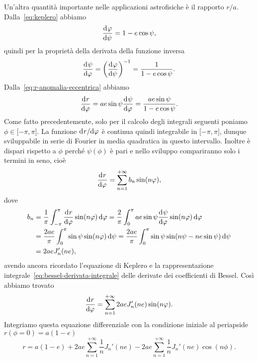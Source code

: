 Un'altra quantità importante nelle applicazioni astrofisiche è il rapporto
$r/a$. Dalla~\eqref{eq:keplero} abbiamo
\begin{equation}
  \frac{{\mathop{}\!\mathrm{d}^{}}\varphi}{\mathop{}\!\mathrm{d} {\psi}^{}} = 1 -e\cos\psi,
\end{equation}
quindi per la proprietà della derivata della funzione inversa
\begin{equation}
  \frac{{\mathop{}\!\mathrm{d}^{}}\psi}{\mathop{}\!\mathrm{d} {\varphi}^{}} =
  \left(
    \frac{{\mathop{}\!\mathrm{d}^{}}\varphi}{\mathop{}\!\mathrm{d} {\psi}^{}}
  \right)^{-1} = \frac{1}{1 - e\cos\psi}.
\end{equation}
Dalla~\eqref{eq:r-anomalia-eccentrica} abbiamo
\begin{equation}
  \frac{{\mathop{}\!\mathrm{d}^{}}r}{\mathop{}\!\mathrm{d} {\varphi}^{}} = ae\sin\psi\frac{{\mathop{}\!\mathrm{d}^{}}\psi}{\mathop{}\!\mathrm{d} {\varphi}^{}} = \frac{ae\sin\psi}{1-e\cos\psi}.
\end{equation}
Come fatto precedentemente, solo per il calcolo degli integrali seguenti poniamo
$\phi \in \mathopen{[}-\pi, \pi\mathclose{]}$. La funzione $\mathrm{d}^{}r / \mathrm{d} {\varphi}^{}$ è
continua quindi integrabile in $\mathopen{[}-\pi, \pi\mathclose{]}$, dunque
sviluppabile in serie di Fourier in media quadratica in questo
intervallo. Inoltre è dispari rispetto a $\phi$ perché $\psi(\phi)$ è pari e
nello sviluppo compariranno solo i termini in seno, cioè
\begin{equation}
  \frac{{\mathop{}\!\mathrm{d}^{}}r}{\mathop{}\!\mathrm{d} {\varphi}^{}} = \sum_{n=1}^{+\infty}b_n\sin(n\varphi),
\end{equation}
dove
\begin{equation}
  \begin{split}
    b_n &= \frac{1}{\pi}\int_{-\pi}^\pi \toder{r}{\phi}\sin(n\phi)\dd\phi =
    \frac{2}{\pi}\int_0^\pi ae\sin\psi\toder{\psi}{\phi}\sin(n\phi)\dd\phi \\
    &= \frac{2ae}{\pi}\int_0^\pi \sin\psi\sin(n\phi)\dd\psi = \frac{2ae}{\pi}
    \int_0^\pi \sin\psi\sin(n\psi - ne\sin\psi)\dd\psi \\
    &= 2aeJ_n'(ne),
  \end{split}
\end{equation}
avendo ancora ricordato l'equazione di Keplero e la rappresentazione
integrale~\eqref{eq:bessel-derivata-integrale} delle derivate dei coefficienti
di Bessel. Così abbiamo trovato
\begin{equation}
  \frac{{\mathop{}\!\mathrm{d}^{}}r}{\mathop{}\!\mathrm{d} {\varphi}^{}} = \sum_{n=1}^{+\infty} 2aeJ_n'(ne)\sin(n\varphi).
\end{equation}
Integriamo questa equazione differenziale con la condizione iniziale al
periapside $r(\phi=0) = a(1-e)$
\begin{equation}
  r = a(1-e) + 2ae\sum_{n=1}^{+\infty}\frac{1}{n}J_n'(ne) -
  2ae\sum_{n=1}^{+\infty}\frac{1}{n}J_n'(ne)\cos(n\phi).
\end{equation}
